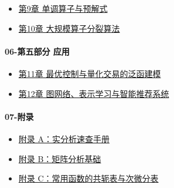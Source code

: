 \begin{itemize}
  \item \hyperref[chap:09]{第9章 单调算子与预解式}
  \item \hyperref[chap:10]{第10章 大规模算子分裂算法}
\end{itemize}

\paragraph{06-第五部分 应用}

\begin{itemize}
  \item \hyperref[chap:11]{第11章 最优控制与量化交易的泛函建模}
  \item \hyperref[chap:12]{第12章 图网络、表示学习与智能推荐系统}
\end{itemize}

\paragraph{07-附录}

\begin{itemize}
  \item \hyperref[app:a]{附录 A：实分析速查手册}
  \item \hyperref[app:b]{附录 B：矩阵分析基础}
  \item \hyperref[app:c]{附录 C：常用函数的共轭表与次微分表}
\end{itemize}
